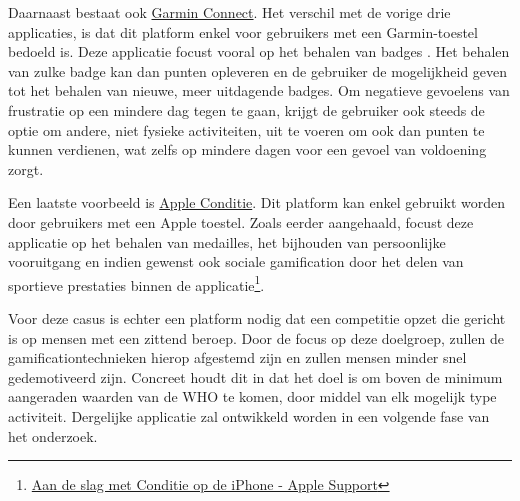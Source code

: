 Daarnaast bestaat ook \href{https://connect.garmin.com/}{Garmin Connect}. Het verschil met de vorige drie applicaties, is dat dit platform enkel voor gebruikers met een Garmin-toestel bedoeld is. Deze applicatie focust vooral op het behalen van badges \autocite{Ilhan2019}. Het behalen van zulke badge kan dan punten opleveren en de gebruiker de mogelijkheid geven tot het behalen van nieuwe, meer uitdagende badges. Om negatieve gevoelens van frustratie op een mindere dag tegen te gaan, krijgt de gebruiker ook steeds de optie om andere, niet fysieke activiteiten, uit te voeren om ook dan punten te kunnen verdienen, wat zelfs op mindere dagen voor een gevoel van voldoening zorgt.

Een laatste voorbeeld is \href{https://support.apple.com/nl-be/guide/iphone/ipha5dddb411/ios}{Apple Conditie}. Dit platform kan enkel gebruikt worden door gebruikers met een Apple toestel. Zoals eerder aangehaald, focust deze applicatie op het behalen van medailles, het bijhouden van persoonlijke vooruitgang en indien gewenst ook sociale gamification door het delen van sportieve prestaties binnen de applicatie\footnote{\href{https://support.apple.com/nl-be/guide/iphone/ipha5dddb411/ios}{Aan de slag met Conditie op de iPhone - Apple Support}}.

Voor deze casus is echter een platform nodig dat een competitie opzet die gericht is op mensen met een zittend beroep. Door de focus op deze doelgroep, zullen de gamificationtechnieken hierop afgestemd zijn en zullen mensen minder snel gedemotiveerd zijn. Concreet houdt dit in dat het doel is om boven de minimum aangeraden waarden van de WHO te komen, door middel van elk mogelijk type activiteit. Dergelijke applicatie zal ontwikkeld worden in een volgende fase van het onderzoek.
